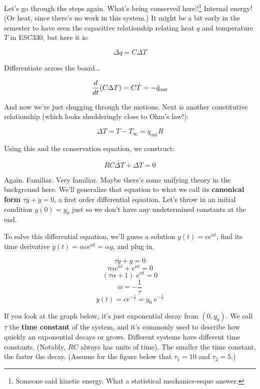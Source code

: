 \documentclass{report}
\begin{document}
\begin{onehalfspacing}
\begin{flushleft}
\medskip

Let's go through the steps again. What's being conserved here?\footnote{Someone said kinetic energy. What a statistical mechanics-esque answer.} Internal energy! (Or heat, since there's no work in this system.) It might be a bit early in the semester to have seen the capacitive relationship relating heat \(q\) and temperature \(T\) in ESC330, but here it is:

\vspace{-0.1in}
\[\Delta q = C \Delta T\]

Differentiate across the board\dots

\vspace{-0.1in}
\[\frac{d}{dt} \qty(C \Delta T) = C\dot{T} = -\dot{q}_\text{out}\]

And now we're just chugging through the motions. Next is another constitutive relationship (which looks shudderingly close to Ohm's law!):

\vspace{-0.1in}
\[\Delta T = T - T_\infty = \dot{q}_\text{out} R\]

Using this and the conservation equation, we construct:

\vspace{-0.1in}
\[\boxed{RC \dot{\Delta T} + \Delta T = 0}\]

Again. Familiar. Very familiar. Maybe there's some unifying theory in the background here. We'll generalize that equation to what we call its \textbf{canonical form} \(\tau \dot{y} + y = 0\), a first order differential equation. Let's throw in an initial condition \(y(0)=y_0\) just so we don't have any undetermined constants at the end.

\medskip

To solve this differential equation, we'll guess a solution \(y(t) = ce^{\alpha t}\), find its time derivative \(\dot{y}(t) = \alpha ce^{\alpha t} = \alpha y\), and plug in.

\vspace{-0.1in}
\[\tau \dot{y} + y = 0\]
\[\tau \alpha e^{\alpha t} + e^{\alpha t} = 0\]
\[(\tau \alpha + 1) \; e^{\alpha t} = 0\]
\[\alpha = -\frac{1}{\tau}\]
\[y(t) = ce^{-\frac{t}{\tau}} = y_0 \; e^{-\frac{t}{\tau}}\]

If you look at the graph below, it's just exponential decay from \((0, y_0)\). We call \(\tau\) the \textbf{time constant} of the system, and it's commonly used to describe how quickly an exponential decays or grows. Different systems have different time constants. (Notably, \(RC\) always has units of time). The smaller the time constant, the faster the decay. (Assume for the figure below that \(\tau_1 = 10\) and \(\tau_2 = 5\).)


\end{flushleft}
\end{onehalfspacing}
\end{document}
